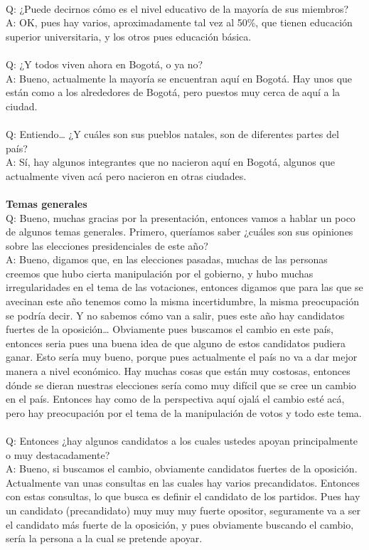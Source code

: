 \documentclass{phyasgn}\usepackage{nag}
\begin{document}
\\
Q: ¿Puede decirnos cómo es el nivel educativo de la mayoría de sus miembros?\\
A: OK, pues hay varios, aproximadamente tal vez al 50\%, que tienen educación superior universitaria, y los otros pues educación básica.\\
\\
Q: ¿Y todos viven ahora en Bogotá, o ya no?\\
A: Bueno, actualmente la mayoría se encuentran aquí en Bogotá. Hay unos que están como a los alrededores de Bogotá, pero puestos muy cerca de aquí a la ciudad. \\
\\
Q: Entiendo… ¿Y cuáles son sus pueblos natales, son de diferentes partes del país?\\
A: Sí, hay algunos integrantes que no nacieron aquí en Bogotá, algunos que actualmente viven acá pero nacieron en otras ciudades. \\
\\
\textbf{Temas generales}\\
Q: Bueno, muchas gracias por la presentación, entonces vamos a hablar un poco de algunos temas generales. Primero, queríamos saber ¿cuáles son sus opiniones sobre las elecciones presidenciales de este año?\\
A: Bueno, digamos que, en las elecciones pasadas, muchas de las personas creemos que hubo cierta manipulación por el gobierno, y hubo muchas irregularidades en el tema de las votaciones, entonces digamos que para las que se avecinan este año tenemos como la misma incertidumbre, la misma preocupación se podría decir. Y no sabemos cómo van a salir, pues este año hay candidatos fuertes de la oposición… Obviamente pues buscamos el cambio en este país, entonces seria pues una buena idea de que alguno de estos candidatos pudiera ganar. Esto sería muy bueno, porque pues actualmente el país no va a dar mejor manera a nivel económico. Hay muchas cosas que están muy costosas, entonces dónde se dieran nuestras elecciones sería como muy difícil que se cree un cambio en el país. Entonces hay como de la perspectiva aquí ojalá el cambio esté acá, pero hay preocupación por el tema de la manipulación de votos y todo este tema. \\
\\
Q: Entonces ¿hay algunos candidatos a los cuales ustedes apoyan principalmente o muy destacadamente?\\
A: Bueno, si buscamos el cambio, obviamente candidatos fuertes de la oposición. Actualmente van unas consultas en las cuales hay varios precandidatos. Entonces con estas consultas, lo que busca es definir el candidato de los partidos. Pues hay un candidato (precandidato) muy muy muy fuerte opositor, seguramente va a ser el candidato más fuerte de la oposición, y pues obviamente buscando el cambio, sería la persona a la cual se pretende apoyar. \\
\end{document}
